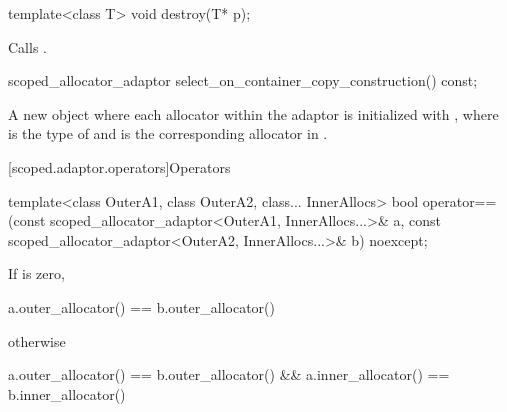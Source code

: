 %
\begin{itemdecl}
template<class T>
  void destroy(T* p);
\end{itemdecl}

\begin{itemdescr}
\pnum
\effects
Calls .
\end{itemdescr}

%
\begin{itemdecl}
scoped_allocator_adaptor select_on_container_copy_construction() const;
\end{itemdecl}

\begin{itemdescr}
\pnum
\returns
A new  object
where each allocator  within the adaptor
is initialized with
,
where  is the type of  and
 is the corresponding allocator in .
\end{itemdescr}

[scoped.adaptor.operators]{Operators}

%
\begin{itemdecl}
template<class OuterA1, class OuterA2, class... InnerAllocs>
  bool operator==(const scoped_allocator_adaptor<OuterA1, InnerAllocs...>& a,
                  const scoped_allocator_adaptor<OuterA2, InnerAllocs...>& b) noexcept;
\end{itemdecl}

\begin{itemdescr}
\pnum
\returns
If  is zero,
\begin{codeblock}
a.outer_allocator() == b.outer_allocator()
\end{codeblock}
otherwise
\begin{codeblock}
a.outer_allocator() == b.outer_allocator() && a.inner_allocator() == b.inner_allocator()
\end{codeblock}
\end{itemdescr}
